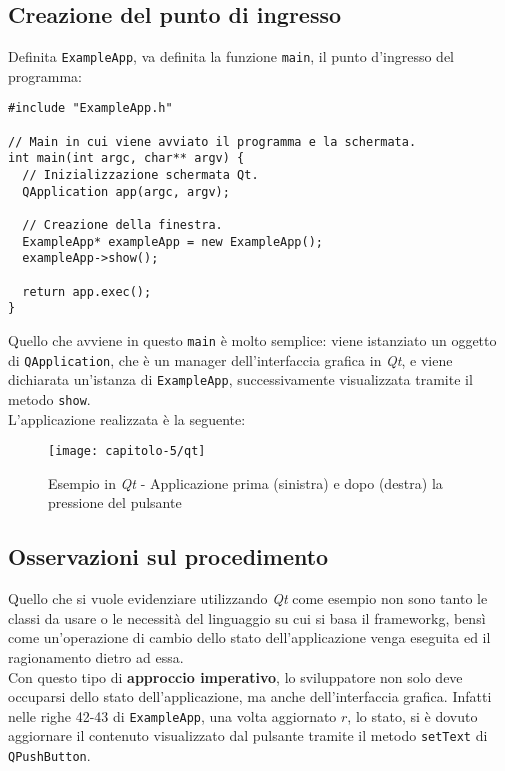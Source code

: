 \subsection{Creazione del punto di ingresso}
\label{subsec:creazione-main-qt}

Definita \texttt{ExampleApp}, va definita la funzione \texttt{main}, il punto d'ingresso del programma:
\begin{lstlisting}
#include "ExampleApp.h"

// Main in cui viene avviato il programma e la schermata.
int main(int argc, char** argv) {
  // Inizializzazione schermata Qt.
  QApplication app(argc, argv);

  // Creazione della finestra.
  ExampleApp* exampleApp = new ExampleApp();
  exampleApp->show();

  return app.exec();
}
\end{lstlisting}
Quello che avviene in questo \texttt{main} è molto semplice: viene istanziato un oggetto di \texttt{QApplication}, che è un manager dell'interfaccia grafica in \emph{Qt}, e viene dichiarata un'istanza di \texttt{ExampleApp}, successivamente visualizzata tramite il metodo \texttt{show}.\\
L'applicazione realizzata è la seguente:
\begin{figure}[!h] 
  \centering 
  \texttt{[image: capitolo-5/qt]} 
  \caption{Esempio in \emph{Qt} - Applicazione prima (sinistra) e dopo (destra) la pressione del pulsante}
\end{figure}

\subsection{Osservazioni sul procedimento}
\label{subsec:osservazioni-procedimento-qt}

Quello che si vuole evidenziare utilizzando \emph{Qt} come esempio non sono tanto le classi da usare o le necessità del linguaggio su cui si basa il \gls{frameworkg}, bensì come un'operazione di cambio dello stato dell'applicazione venga eseguita ed il ragionamento dietro ad essa.\\
Con questo tipo di \textbf{approccio imperativo}, lo sviluppatore non solo deve occuparsi dello stato dell'applicazione, ma anche dell'interfaccia grafica. Infatti nelle righe 42-43 di \texttt{ExampleApp}, una volta aggiornato $r$, lo stato, si è dovuto aggiornare il contenuto visualizzato dal pulsante tramite il metodo \texttt{setText} di \texttt{QPushButton}.
